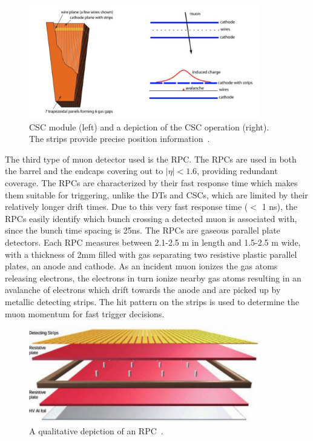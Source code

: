\begin{figure}[hbtp]
 \begin{center}
   \includegraphics[width=0.9\textwidth]{ch3_figs/cms_csc.pdf}
   \caption[CSC module and operation schematic]{CSC module (left) and a depiction of the CSC operation (right). The strips provide precise position information~\cite{cms_bluebook}.}
   \label{fig:cms_csc}
 \end{center}
\end{figure}

The third type of muon detector used is the RPC. The RPCs are used in both the barrel and the endcaps covering out to $|\eta| < 1.6$,
providing redundant coverage. The RPCs are characterized by their fast response time which makes them suitable for triggering, unlike the DTs and CSCs, which 
are limited by their relatively longer drift times.
Due to this very fast response time ($<$ 1 ns), the RPCs easily identify which bunch crossing a detected muon is associated with, since the bunch time spacing is 25ns.  
The RPCs are gaseous parallel plate detectors. Each RPC measures between 2.1-2.5 m in length and 1.5-2.5 m wide, with a thickness of 2mm filled with gas separating
two resistive plastic parallel plates, an anode and cathode.
As an incident muon ionizes the gas atoms releasing electrons, the electrons in turn ionize nearby gas atoms resulting in an avalanche of electrons which drift towards the anode
and are picked up by metallic detecting strips. The hit pattern on the strips is used to determine the muon momentum for fast trigger decisions.

\begin{figure}[hbtp]
 \begin{center}
   \includegraphics[width=0.9\textwidth]{ch3_figs/cms_rpc.pdf}
   \caption[CMS RPC diagram]{A qualitative depiction of an RPC~\cite{cms_bluebook}.}
   \label{fig:cms_rpc}
 \end{center}
\end{figure}
 
